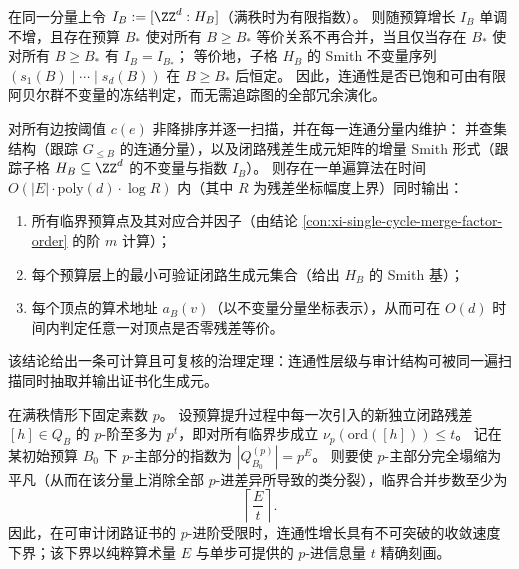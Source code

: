 \begin{conclusion}\label{con:xi-smith-invariants-freeze-stabilization}
在同一分量上令 \(I_B:=[\ZZ^d:H_B]\)（满秩时为有限指数）。
则随预算增长 \(I_B\) 单调不增，且存在预算 \(B_\ast\) 使对所有 \(B\ge B_\ast\) 等价关系不再合并，当且仅当存在 \(B_\ast\) 使对所有 \(B\ge B_\ast\) 有 \(I_B=I_{B_\ast}\)；
等价地，子格 \(H_B\) 的 Smith 不变量序列 \((s_1(B)\mid\cdots\mid s_d(B))\) 在 \(B\ge B_\ast\) 后恒定。
因此，连通性是否已饱和可由有限阿贝尔群不变量的冻结判定，而无需追踪图的全部冗余演化。
\end{conclusion}

\begin{conclusion}\label{con:xi-one-pass-governance-algorithm}
对所有边按阈值 \(c(e)\) 非降排序并逐一扫描，并在每一连通分量内维护：
并查集结构（跟踪 \(G_{\le B}\) 的连通分量），以及闭路残差生成元矩阵的增量 Smith 形式（跟踪子格 \(H_B\subseteq\ZZ^d\) 的不变量与指数 \(I_B\)）。
则存在一单遍算法在时间
\(
O(|E|\cdot \mathrm{poly}(d)\cdot \log R)
\)
内（其中 \(R\) 为残差坐标幅度上界）同时输出：
\begin{enumerate}
  \item 所有临界预算点及其对应合并因子（由结论 \ref{con:xi-single-cycle-merge-factor-order} 的阶 \(m\) 计算）；
  \item 每个预算层上的最小可验证闭路生成元集合（给出 \(H_B\) 的 Smith 基）；
  \item 每个顶点的算术地址 \(a_B(v)\)（以不变量分量坐标表示），从而可在 \(O(d)\) 时间内判定任意一对顶点是否零残差等价。
\end{enumerate}
该结论给出一条可计算且可复核的治理定理：连通性层级与审计结构可被同一遍扫描同时抽取并输出证书化生成元。
\end{conclusion}

\begin{conclusion}\label{con:xi-merge-depth-lower-bound-padic}
在满秩情形下固定素数 \(p\)。
设预算提升过程中每一次引入的新独立闭路残差 \([h]\in Q_B\) 的 \(p\)-阶至多为 \(p^{t}\)，即对所有临界步成立
\(
\nu_p(\mathrm{ord}([h]))\le t
\)。
记在某初始预算 \(B_0\) 下 \(p\)-主部分的指数为 \(|Q_{B_0}^{(p)}|=p^{E}\)。
则要使 \(p\)-主部分完全塌缩为平凡（从而在该分量上消除全部 \(p\)-进差异所导致的类分裂），临界合并步数至少为
\[
\left\lceil \frac{E}{t}\right\rceil.
\]
因此，在可审计闭路证书的 \(p\)-进阶受限时，连通性增长具有不可突破的收敛速度下界；该下界以纯粹算术量 \(E\) 与单步可提供的 \(p\)-进信息量 \(t\) 精确刻画。
\end{conclusion}

